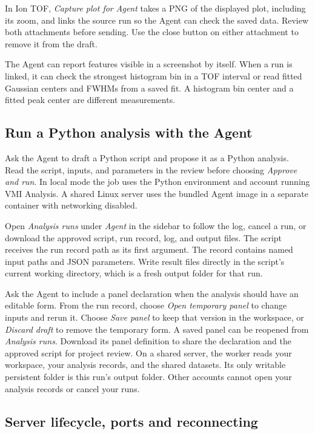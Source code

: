 \documentclass[11pt,a4paper]{article}
\begin{document}
In Ion TOF, \emph{Capture plot for Agent} takes a PNG of the displayed plot,
including its zoom, and links the source run so the Agent can check the saved
data. Review both attachments before sending. Use the close button on either
attachment to remove it from the draft.

The Agent can report features visible in a screenshot by itself. When a run
is linked, it can check the strongest histogram bin in a TOF interval or
read fitted Gaussian centers and FWHMs from a saved fit. A histogram bin
center and a fitted peak center are different measurements.

\subsection{Run a Python analysis with the Agent}

Ask the Agent to draft a Python script and propose it as a Python analysis.
Read the script, inputs, and parameters in the review before choosing
\emph{Approve and run}. In local mode the job uses the Python environment
and account running VMI Analysis. A shared Linux server uses the bundled
Agent image in a separate container with networking disabled.

Open \emph{Analysis runs} under \emph{Agent} in the sidebar to follow the log, cancel a
run, or download the approved script, run record, log, and output files.
The script receives the run record path as its first argument. The record
contains named input paths and JSON parameters. Write result files directly
in the script's current working directory, which is a fresh output folder
for that run.

Ask the Agent to include a panel declaration when the analysis should have
an editable form. From the run record, choose \emph{Open temporary panel}
to change inputs and rerun it. Choose \emph{Save panel} to keep that version
in the workspace, or \emph{Discard draft} to remove the temporary form.
A saved panel can be reopened from \emph{Analysis runs}. Download its panel
definition to share the declaration and the approved script for project
review. On a shared server, the worker reads your workspace, your analysis
records, and the shared datasets. Its only writable persistent folder is
this run's output folder. Other accounts cannot open your analysis records
or cancel your runs.

\subsection{Server lifecycle, ports and reconnecting}
\label{sec:lifecycle}
\end{document}
